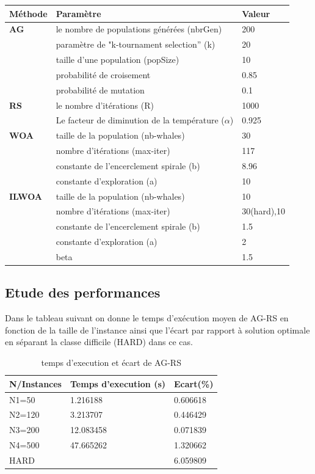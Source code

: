 \documentclass[preprint]{elsarticle}
\begin{document}
\begin{tabular}{l|l|l}
    \hline
    \textbf{Méthode} & \textbf{Paramètre} & \textbf{Valeur}  \\
    \hline
    \textbf{AG} & le nombre de populations générées (nbrGen) & 200 \\ \cline{2-3}
      &paramètre de "k-tournament selection” (k) & 20 \\ \cline{2-3}
      &taille d’une population (popSize) & 10 \\ \cline{2-3}
      &probabilité de croisement & 0.85 \\ \cline{2-3}
      &probabilité de mutation & 0.1\\
    \hline
    \textbf{RS} & le nombre d'itérations (R) & 1000 \\ \cline{2-3}
      & Le facteur de diminution de la température ($\alpha $) & 0.925 \\ \cline{2-3}
    \hline
    \textbf{WOA} & taille de la population (nb-whales) & 30 \\ \cline{2-3}
      & nombre d’itérations (max-iter) & 117 \\ \cline{2-3}
      & constante de l’encerclement spirale (b) & 8.96 \\ \cline{2-3}
      & constante d’exploration (a) & 10 \\ \cline{2-3}
    \hline
    \textbf{ILWOA} & taille de la population (nb-whales) & 10 \\ \cline{2-3}
    & nombre d’itérations (max-iter) & 30(hard),10 \\ \cline{2-3}
    & constante de l’encerclement spirale (b) & 1.5 \\ \cline{2-3}
    & constante d’exploration (a) & 2 \\ \cline{2-3}
    & beta & 1.5 \\ \cline{2-3}
  \hline

\end{tabular}


\subsection{Etude des performances}
Dans le tableau suivant on donne le temps d'exécution moyen de AG-RS en fonction de la taille de l’instance ainsi que l’écart par rapport à solution optimale  en séparant la classe difficile (HARD) dans ce cas. 
\begin{table}[h]
    \centering
    \begin{tabular}{l l l}
    \hline
    \textbf{N/Instances} & \textbf{Temps d'execution (s)} & \textbf{Ecart(\%)} \\
    \hline
    N1=50  & 1.216188 & 0.606618  \\
    \hline
    N2=120  & 3.213707 & 0.446429  \\
    \hline
    N3=200  & 12.083458 & 0.071839  \\
    \hline
    N4=500  & 47.665262 & 1.320662  \\
    \hline
    HARD  &  & 6.059809 \\
    \end{tabular}
    \caption{temps d'execution et écart de AG-RS}
\end{table}
\end{document}
